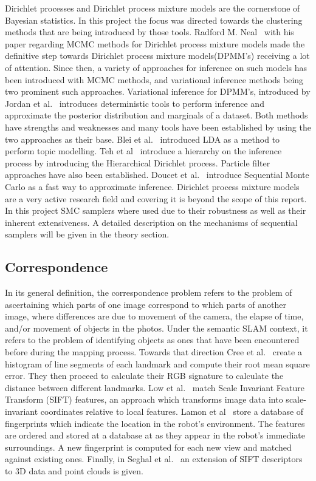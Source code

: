 \documentclass[twoside,hidelinks]{article}
\begin{document}
Dirichlet processes and Dirichlet process mixture models are the cornerstone of Bayesian statistics. In this project the focus was directed towards the clustering methods that are being introduced by those tools. Radford M. Neal~\cite{bayes:neal} with his paper regarding MCMC methods for Dirichlet process mixture models made the definitive step towards Dirichlet process mixture models(DPMM's) receiving a lot of attention. Since then, a variety of approaches for inference on such models has been introduced with MCMC methods, and variational inference methods being two prominent such approaches. Variational inference for DPMM's, introduced by Jordan et al.~\cite{bayes:jordan} introduces deterministic tools to perform inference and approximate the posterior distribution and marginals of a dataset. Both methods have strengths and weaknesses and many tools have been established by using the two approaches as their base. Blei et al.~\cite{LDA} introduced LDA as a method to perform topic modelling. Teh et al~\cite{bayes:hier} introduce a hierarchy on the inference process by introducing the Hierarchical Dirichlet process. Particle filter approaches have also been established. Doucet et al.~\cite{bayes:smc} introduce Sequential Monte Carlo as a fast way to approximate inference. Dirichlet process mixture models are a very active research field and covering it is beyond the scope of this report. In this project SMC samplers where used due to their robustness as well as their inherent extensiveness. A detailed description on the mechanisms of sequential samplers will be given in the theory section.

\subsection{Correspondence}

In its general definition, the correspondence problem refers to the problem of ascertaining which parts of one image correspond to which parts of another image, where differences are due to movement of the camera, the elapse of time, and/or movement of objects in the photos. Under the semantic SLAM context, it refers to the problem of identifying objects as ones that have been encountered before during the mapping process. Towards that direction Cree et al.~\cite{corresp:first} create a histogram of line segments of each landmark and compute their root mean square error. They then proceed to calculate their RGB signature to calculate the distance between different landmarks. Low et al.~\cite{corres:sec} match Scale Invariant Feature Transform (SIFT) features, an approach which transforms image data into scale-invariant coordinates relative to local features. Lamon et al~\cite{corres:three} store a database of fingerprints which indicate the location in the robot's environment. The features are ordered and stored at a database at as they appear in the robot's immediate surroundings. A new fingerprint is computed for each new view and matched against existing ones. Finally, in Seghal et al.~\cite{corres:four} an extension of SIFT descriptors to 3D data and point clouds is given.
\end{document}
